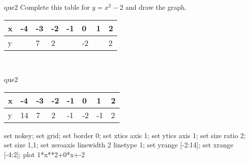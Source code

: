 \documentclass[13.5pt, varwidth=true]{beamer}
\begin{document}
\begin{frame}[shrink=19,fragile]
	\begin{beamercolorbox}[rounded=true, left, shadow=true,wd=14.8cm]{que2}
		 Complete this table for $y = x^{2} - 2$ and draw the graph. \\[0.3cm] \renewcommand{\arraystretch}{1.2}\begin{tabular}{|C|C|C|C|C|C|C|C|} \hline x & -4 & -3 & -2 & -1 & 0 & 1 & 2 \\ \hline y &  & 7 & 2 &  & -2 &  & 2\\ \hline \end{tabular}\\[0.3cm]
	\end{beamercolorbox}
\end{frame}
\begin{frame}[shrink=19,fragile]
	\begin{beamercolorbox}[rounded=true, left, shadow=true,wd=14.8cm]{que2}
		\renewcommand{\arraystretch}{1.2}\begin{tabular}{|C|C|C|C|C|C|C|C|} \hline x & -4 & -3 & -2 & -1 & 0 & 1 & 2 \\ \hline y & 14 & 7 & 2 & -1 & -2 & -1 & 2\\ \hline \end{tabular}\begin{gnuplot}[terminal=pdf] set nokey; set grid; set border 0; set xtics axis 1; set ytics axis 1; set size ratio 2; set size 1,1; set zeroaxis linewidth 2 linetype 1; set yrange [-2:14]; set xrange [-4:2]; plot 1*x**2+0*x+-2 \end{gnuplot}
	\end{beamercolorbox}
\end{frame}
\end{document}

